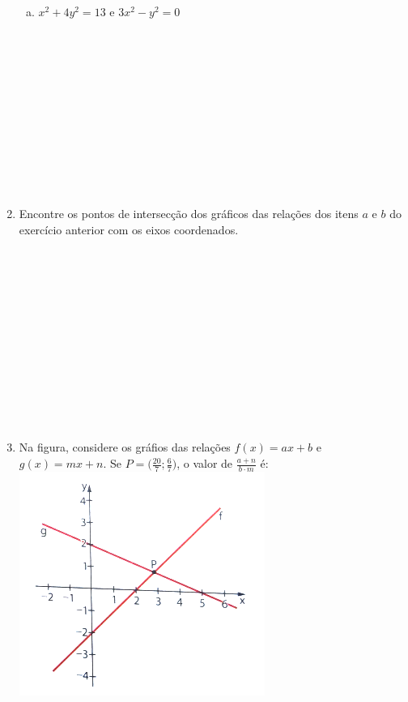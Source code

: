 \documentclass[a4paper,14pt]{article}
\begin{document}
\begin{multicols}{2}
\begin{enumerate}
\begin{enumerate}[a)]
	        	\item $x^2 + 4y^2 = 13$ e $3x^2 - y^2 = 0$ \\\\\\\\\\\\\\\\\\\\\\\\
	        \end{enumerate}
            \item Encontre os pontos de intersecção dos gráficos das relações dos itens $a$ e $b$ do exercício anterior com os eixos coordenados. \\\\\\\\\\\\\\\\\\\\\\\\\\
            \item Na figura, considere os gráfios das relações $f(x) = ax + b$ e $g(x) = mx + n$. Se $P = \bigg(\frac{20}{7}; \frac{6}{7}\bigg)$, o valor de $\frac{a + n}{b \cdot m}$ é: 
            \includegraphics[width=1\linewidth]{imagens_8FMA72/imagens1}
        \end{enumerate}
    $~$ \\ $~$ \\ $~$ \\ $~$ \\ $~$ \\ $~$
    \end{multicols}
\end{document}
